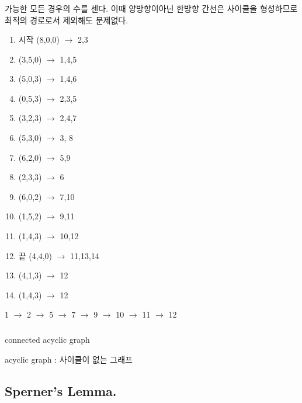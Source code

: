 \documentclass{oblivoir}
\begin{document}
\subsubsection{} 
%
\subsubsection{} 
%
\subsubsection{} 

가능한 모든 경우의 수를 센다. 이때 양방향이아닌 한방향 간선은 사이클을 형성하므로 최적의 경로로서 제외해도 문제없다.

\begin{enumerate}
    \item 시작 (8,0,0) $\rightarrow$ 2,3
    \item (3,5,0) $\rightarrow$ 1,4,5
    \item (5,0,3) $\rightarrow$ 1,4,6
    \item (0,5,3) $\rightarrow$ 2,3,5
    \item (3,2,3) $\rightarrow$ 2,4,7
    \item (5,3,0) $\rightarrow$ 3, 8
    \item (6,2,0) $\rightarrow$ 5,9
    \item (2,3,3) $\rightarrow$ 6
    \item (6,0,2) $\rightarrow$ 7,10
    \item (1,5,2) $\rightarrow$ 9,11
    \item (1,4,3) $\rightarrow$ 10,12
    \item 끝 (4,4,0) $\rightarrow$ 11,13,14
    \item (4,1,3) $\rightarrow$ 12
    \item (1,4,3) $\rightarrow$ 12
\end{enumerate} 
1 $\rightarrow$ 2 $\rightarrow$ 5 $\rightarrow$ 7 $\rightarrow$ 9 $\rightarrow$ 10 $\rightarrow$ 11 $\rightarrow$ 12
\subsubsection{} 

\begin{dfn}[tree] connected acyclic graph

    acyclic graph : 사이클이 없는 그래프
\end{dfn}
\subsection{Sperner's Lemma.}
\end{document}

